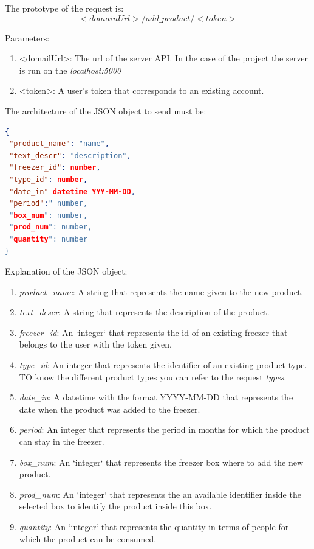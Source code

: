 The prototype of the request is:
$$<domainUrl>/add\_product/<token>$$

Parameters:
\begin{enumerate}
\item <domailUrl>: The url of the server API. In the case of the project the server is run on the \textit{localhost:5000}
\item <token>: A user's token that corresponds to an existing account.
\end{enumerate}

The architecture of the JSON object to send must be:
\begin{lstlisting}[language=json]
{
 "product_name": "name",
 "text_descr": "description",
 "freezer_id": number,
 "type_id": number,
 "date_in" datetime YYY-MM-DD,
 "period":" number,
 "box_num": number,
 "prod_num": number,
 "quantity": number
}
\end{lstlisting}

Explanation of the  JSON object:
\begin{enumerate}
\item \textit{product\_name}: A string that represents the name given to the new product.
\item \textit{text\_descr}: A string that represents the description of the product.
\item \textit{freezer\_id}: An `integer` that represents the id of an existing freezer that belongs to the user with the token given.
\item \textit{type\_id}: An integer that represents the identifier of an existing product type. TO know the different product types you can refer to the request \textit{types}.
\item \textit{date\_in}: A datetime with the format YYYY-MM-DD that represents the date when the product was added to the freezer.
\item \textit{period}: An integer that represents the period in months for which the product can stay in the freezer.
\item \textit{box\_num}: An `integer` that represents the freezer box where to add the new product.
\item \textit{prod\_num}: An `integer` that represents the an available identifier inside the selected box to identify the product inside this box.
\item \textit{quantity}: An `integer` that represents the quantity in terms of people for which the product can be consumed.
\end{enumerate}


